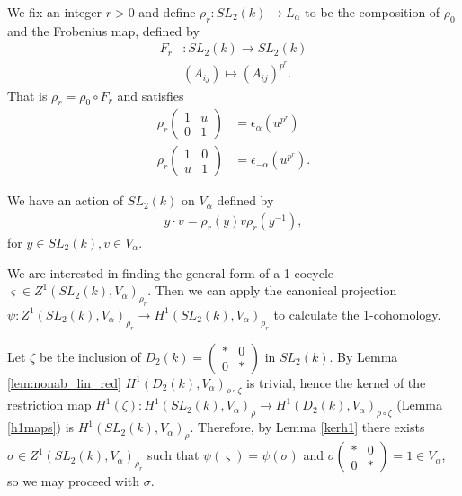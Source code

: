 We fix an integer $r > 0$ and define $\rho_r:SL_2(k) \rightarrow L_\alpha$ to be the composition of $\rho_0$ and the Frobenius map, defined by
\begin{align*}
F_r&:SL_2(k)\rightarrow SL_2(k) \\
& (A_{ij}) \mapsto (A_{ij})^{p^r}.
\end{align*}
That is $\rho_r = \rho_0 \circ F_r$ and satisfies
\begin{align*}
\rho_r \left(\begin{matrix} 1 &  u \\ 0 & 1 \end{matrix} \right) &= \epsilon_\alpha(u^{p^r}) \\
\rho_r \left(\begin{matrix} 1 & 0 \\ u & 1 \end{matrix} \right) &= \epsilon_{-\alpha}(u^{p^r}).
\end{align*}

We have an action of $SL_2(k)$ on $V_\alpha$ defined by
\begin{align*}
	y \cdot v = \rho_r(y)v\rho_r(y^{-1}),
\end{align*}
for $y \in SL_2(k), v \in V_\alpha$.

We are interested in finding the general form of a 1-cocycle $\varsigma \in Z^1(SL_2(k), V_\alpha)_{\rho_r}$. Then we can apply the canonical projection $\psi:Z^1(SL_2(k), V_\alpha)_{\rho_r} \rightarrow H^1(SL_2(k), V_\alpha)_{\rho_r}$ to calculate the 1-cohomology.

Let $\zeta$ be the inclusion of $D_2(k) = \left(\begin{matrix}* & 0\\0 & *\end{matrix}\right)$ in $SL_2(k)$. By Lemma \ref{lem:nonab_lin_red} $H^1(D_2(k), V_\alpha)_{\rho\circ \zeta}$ is trivial, hence the kernel of the restriction map $H^1(\zeta):H^1(SL_2(k), V_\alpha)_\rho \rightarrow H^1(D_2(k), V_\alpha)_{\rho\circ\zeta}$ (Lemma \ref{h1maps}) is $H^1(SL_2(k), V_\alpha)_\rho$. Therefore, by Lemma \ref{kerh1} there exists $\sigma\in Z^1(SL_2(k), V_\alpha)_{\rho_r}$ such that $\psi(\varsigma) = \psi(\sigma)$ and $\sigma\left(\begin{matrix}* & 0 \\ 0 & *\end{matrix}\right) = 1 \in V_\alpha$, so we may proceed with $\sigma$.

